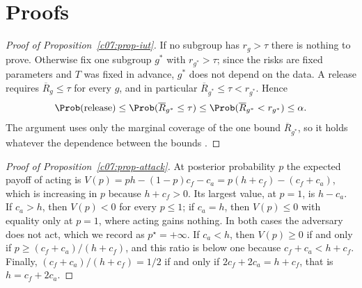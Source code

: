 \section{Proofs}\label{c07:sec-proofs}

\begin{proof}[Proof of Proposition~\ref{c07:prop-iut}]
If no subgroup has $r_g > \tau$ there is nothing to prove. Otherwise fix one
subgroup $g^\ast$ with $r_{g^\ast} > \tau$; since the risks are fixed parameters and
$T$ was fixed in advance, $g^\ast$ does not depend on the data. A release requires
$\overline{R}_g \le \tau$ for every $g$, and in particular
$\overline{R}_{g^\ast} \le \tau < r_{g^\ast}$. Hence
\[
\Prob(\text{release}) \le \Prob(\overline{R}_{g^\ast} \le \tau)
\le \Prob(\overline{R}_{g^\ast} < r_{g^\ast}) \le \alpha .
\]
The argument uses only the marginal coverage of the one bound
$\overline{R}_{g^\ast}$, so it holds whatever the dependence between the bounds
\citep{berger1982}.
\end{proof}

\begin{proof}[Proof of Proposition~\ref{c07:prop-attack}]
At posterior probability $p$ the expected payoff of acting is
$V(p) = ph - (1-p)c_f - c_a = p(h + c_f) - (c_f + c_a)$, which is increasing in $p$
because $h + c_f > 0$. Its largest value, at $p = 1$, is $h - c_a$. If $c_a > h$,
then $V(p) < 0$ for every $p \le 1$; if $c_a = h$, then $V(p) \le 0$ with equality
only at $p = 1$, where acting gains nothing. In both cases the adversary does not
act, which we record as $p^\star = +\infty$. If $c_a < h$, then $V(p) \ge 0$ if and
only if $p \ge (c_f + c_a)/(h + c_f)$, and this ratio is below one because
$c_f + c_a < h + c_f$. Finally, $(c_f + c_a)/(h + c_f) = 1/2$ if and only if
$2c_f + 2c_a = h + c_f$, that is $h = c_f + 2c_a$.
\end{proof}
